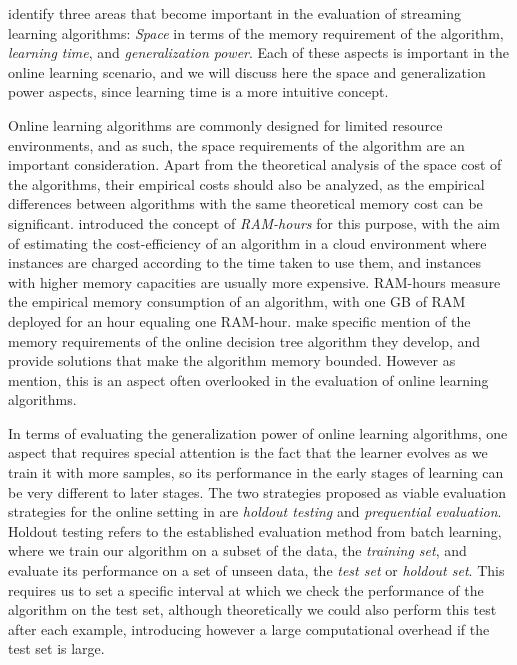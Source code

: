 \citet{online-evaluation-journal} identify three areas that
become important in the evaluation of streaming learning
algorithms: \emph{Space} in terms of the memory requirement of the algorithm, \emph{learning time}, and \emph{generalization power}.
Each of these aspects is important in the online learning scenario, and
we will discuss here the space and generalization power aspects, since
learning time is a more intuitive concept.


Online learning algorithms are commonly designed for limited resource environments,
and as such, the space requirements of the algorithm are an important consideration.
Apart from the theoretical analysis of the space cost of the algorithms,
their empirical costs should also be analyzed, as the empirical differences
between algorithms with the same theoretical memory cost can be
significant. \citet{ram-hours} introduced
the concept of \emph{RAM-hours} for this purpose, with the aim of estimating
the cost-efficiency of an algorithm in a cloud environment where instances
are charged according to the time taken to use them, and instances with
higher memory capacities are usually more expensive.
RAM-hours measure the empirical memory consumption of an
algorithm, with one GB of RAM deployed for an hour equaling one RAM-hour.
\citet{vfdt}
make specific mention of the memory requirements of the online decision
tree algorithm they develop, and provide solutions that make the algorithm
memory bounded. However as \citet{online-evaluation-journal} mention, this
is an aspect often overlooked in the evaluation of online learning
algorithms.

In terms of evaluating the generalization power of online learning
algorithms, one aspect that requires special attention is the fact
that the learner evolves as we train it with more samples, so its
performance in the early stages of learning can be very different
to later stages. The two strategies proposed as viable evaluation strategies for the online
setting in \cite{online-evaluation-journal} are \emph{holdout testing}
and \emph{prequential evaluation}. Holdout testing refers to the
established evaluation method from batch learning, where we train
our algorithm on a subset of the data, the \emph{training set},
and evaluate its performance on a set of unseen data, the
\emph{test set} or \emph{holdout set}. This requires us to set a
specific interval at which we check the performance of the algorithm
on the test set, although theoretically we could also perform this
test after each example, introducing however a large computational overhead if
the test set is large.

